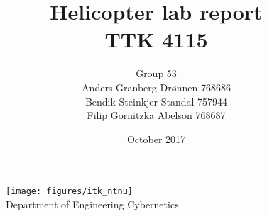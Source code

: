 \documentclass[11pt, a4paper, USenglish]{article} %
\numberwithin{equation}{section}
\begin{document}
\title{\textbf{Helicopter lab report}\\ \textbf{TTK 4115}}
\author{Group 53\\Anders Granberg Drønnen 768686\\Bendik Steinkjer Standal 757944\\Filip Gornitzka Abelson 768687}
\date{October 2017}
\begin{titlepage}
    \maketitle
    \begin{figure}
    \centering
    \texttt{[image: figures/itk\_ntnu]}\\
    Department of Engineering Cybernetics
    \end{figure}
    \thispagestyle{empty}
\end{titlepage}

\newpage

\thispagestyle{empty} %

\newpage
\tableofcontents
\thispagestyle{empty} %

\newpage
\setcounter{page}{1}









\newpage
{}
\printbibliography{}
\label{sec:bibliography}
\end{document}
